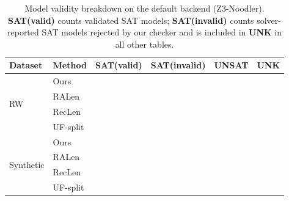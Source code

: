 \begin{table}[t]
    \centering
    \caption{Model validity breakdown on the default backend (Z3-Noodler).
        \textbf{SAT(valid)} counts validated SAT models; \textbf{SAT(invalid)} counts solver-reported SAT models rejected by our checker and is included in \textbf{UNK} in all other tables.}
    \label{tab:validity-summary}
    \setlength{\tabcolsep}{3pt}
    \begin{tabular}{l|l|c|c|c|c}
        \toprule
        \textbf{Dataset} & \textbf{Method} & \textbf{SAT(valid)} & \textbf{SAT(invalid)} & \textbf{UNSAT} & \textbf{UNK} \\
        \midrule
        \multirow{4}{*}{RW}
                         & Ours            & \EXPtodo{--}        & \EXPtodo{--}          & \EXPtodo{--}   & \EXPtodo{--} \\
                         & RALen           & \EXPtodo{--}        & \EXPtodo{--}          & \EXPtodo{--}   & \EXPtodo{--} \\
                         & RecLen          & \EXPtodo{--}        & \EXPtodo{--}          & \EXPtodo{--}   & \EXPtodo{--} \\
                         & UF-split        & \EXPtodo{--}        & \EXPtodo{--}          & \EXPtodo{--}   & \EXPtodo{--} \\
        \midrule
        \multirow{4}{*}{Synthetic}
                         & Ours            & \EXPtodo{--}        & \EXPtodo{--}          & \EXPtodo{--}   & \EXPtodo{--} \\
                         & RALen           & \EXPtodo{--}        & \EXPtodo{--}          & \EXPtodo{--}   & \EXPtodo{--} \\
                         & RecLen          & \EXPtodo{--}        & \EXPtodo{--}          & \EXPtodo{--}   & \EXPtodo{--} \\
                         & UF-split        & \EXPtodo{--}        & \EXPtodo{--}          & \EXPtodo{--}   & \EXPtodo{--} \\
        \bottomrule
    \end{tabular}
\end{table}